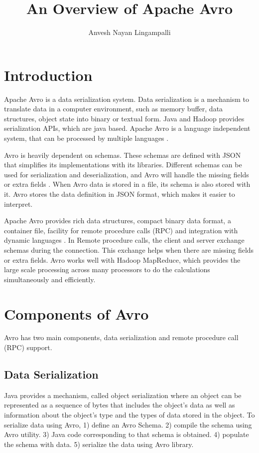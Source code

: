 \documentclass[9pt,twocolumn,twoside]{../../styles/osajnl}
\title{An Overview of Apache Avro}
\author[1]{Anvesh Nayan Lingampalli}
\affil[1]{School of Informatics and Computing, Bloomington, IN 47408, U.S.A.}
\affil[*]{Corresponding authors: anveling@umail.iu.edu}
\begin{document}
\maketitle

\section{Introduction} 

Apache Avro \cite{www-apache-avro} is a data serialization
system. Data serialization is a mechanism to translate data in a
computer environment, such as memory buffer, data structures, object
state into binary or textual form.  Java and Hadoop provides
serialization APIs, which are java based. Apache Avro is a language
independent system, that can be processed by multiple languages
\cite{www-doc-avro}.

Avro is heavily dependent on schemas. These schemas are defined with
JSON that simplifies its implementations with its libraries. Different
schemas can be used for serialization and deserialization, and Avro
will handle the missing fields or extra fields
\cite{www-tutorialspoint-avro}. When Avro data is stored in a file,
its schema is also stored with it. Avro stores the data definition in
JSON format, which makes it easier to interpret.

Apache Avro provides rich data structures, compact binary data format,
a container file, facility for remote procedure calls (RPC) and
integration with dynamic languages \cite{www-apache-avro}. In Remote
procedure calls, the client and server exchange schemas during the
connection. This exchange helps when there are missing fields or extra
fields. Avro works well with Hadoop MapReduce, which provides the
large scale processing across many processors to do the calculations
simultaneously and efficiently.

\section{Components of Avro}

Avro has two main components, data serialization and remote procedure
call (RPC) support.\cite{www-using-avro}

\subsection{Data Serialization}

Java provides a mechanism, called object serialization where an object
can be represented as a sequence of bytes that includes the object's
data as well as information about the object's type and the types of
data stored in the object. To serialize data using Avro,
1) define an Avro Schema.
2) compile the schema using Avro utility.
3) Java code corresponding to that schema is obtained.
4) populate the schema with data.
5) serialize the data using Avro library\cite{www-avro-serialzation}.
\end{document}

